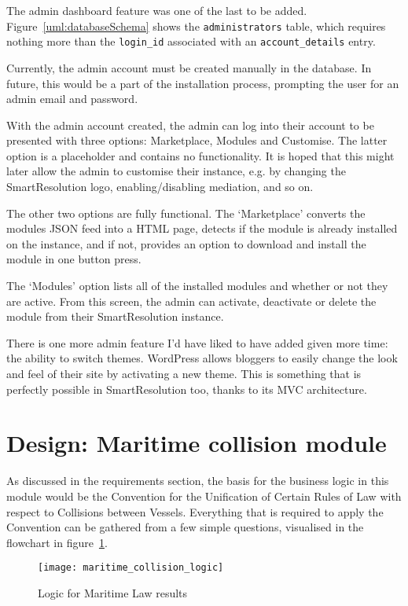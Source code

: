 The admin dashboard feature was one of the last to be added. Figure~\ref{uml:databaseSchema} shows the \lstinline{administrators} table, which requires nothing more than the \lstinline{login_id} associated with an \lstinline{account_details} entry.

Currently, the admin account must be created manually in the database. In future, this would be a part of the installation process, prompting the user for an admin email and password.

With the admin account created, the admin can log into their account to be presented with three options: Marketplace, Modules and Customise. The latter option is a placeholder and contains no functionality. It is hoped that this might later allow the admin to customise their instance, e.g. by changing the SmartResolution logo, enabling/disabling mediation, and so on.

The other two options are fully functional. The `Marketplace' converts the modules JSON feed into a HTML page, detects if the module is already installed on the instance, and if not, provides an option to download and install the module in one button press.

The `Modules' option lists all of the installed modules and whether or not they are active. From this screen, the admin can activate, deactivate or delete the module from their SmartResolution instance.

There is one more admin feature I'd have liked to have added given more time: the ability to switch themes. WordPress allows bloggers to easily change the look and feel of their site by activating a new theme. This is something that is perfectly possible in SmartResolution too, thanks to its MVC architecture.

\section{Design: Maritime collision module}

As discussed in the requirements section, the basis for the business logic in this module would be the Convention for the Unification of Certain Rules of Law with respect to Collisions between Vessels. Everything that is required to apply the Convention can be gathered from a few simple questions, visualised in the flowchart in figure~\ref{uml:maritimeLogic}.

\begin{figure}[h!]
  \centering
    \ifimages
    \texttt{[image: maritime\_collision\_logic]}
    \fi
  \caption{Logic for Maritime Law results}
  \label{uml:maritimeLogic}
\end{figure}

